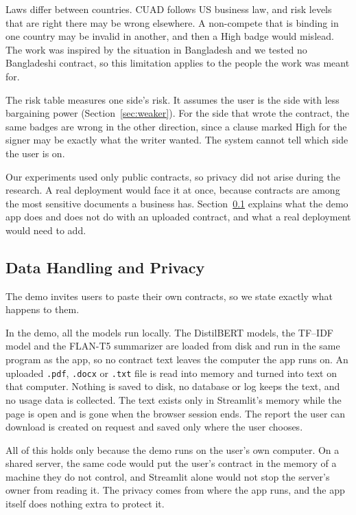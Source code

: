 Laws differ between countries. CUAD follows US business law, and risk levels that are right there may be wrong elsewhere. A non-compete that is binding in one country may be invalid in another, and then a High badge would mislead. The work was inspired by the situation in Bangladesh and we tested no Bangladeshi contract, so this limitation applies to the people the work was meant for.

The risk table measures one side's risk. It assumes the user is the side with less bargaining power (Section~\ref{sec:weaker}). For the side that wrote the contract, the same badges are wrong in the other direction, since a clause marked High for the signer may be exactly what the writer wanted. The system cannot tell which side the user is on.

Our experiments used only public contracts, so privacy did not arise during the research. A real deployment would face it at once, because contracts are among the most sensitive documents a business has. Section~\ref{sec:privacy} explains what the demo app does and does not do with an uploaded contract, and what a real deployment would need to add.

\subsection{Data Handling and Privacy}
\label{sec:privacy}
The demo invites users to paste their own contracts, so we state exactly what happens to them.

In the demo, all the models run locally. The DistilBERT models, the TF--IDF model and the FLAN-T5 summarizer are loaded from disk and run in the same program as the app, so no contract text leaves the computer the app runs on. An uploaded \texttt{.pdf}, \texttt{.docx} or \texttt{.txt} file is read into memory and turned into text on that computer. Nothing is saved to disk, no database or log keeps the text, and no usage data is collected. The text exists only in Streamlit's memory while the page is open and is gone when the browser session ends. The report the user can download is created on request and saved only where the user chooses.

All of this holds only because the demo runs on the user's own computer. On a shared server, the same code would put the user's contract in the memory of a machine they do not control, and Streamlit alone would not stop the server's owner from reading it. The privacy comes from where the app runs, and the app itself does nothing extra to protect it.

